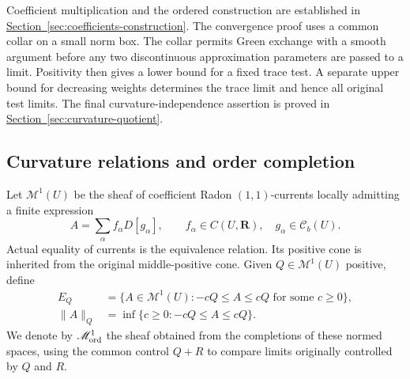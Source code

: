 \documentclass[11pt,reqno]{amsart}
\theoremstyle{definition}
\theoremstyle{remark}
\numberwithin{equation}{section}
\newcommand{\Cb}{\mathcal C_b}
\newcommand{\Mone}{\mathscr M^1}
\newcommand{\Real}{\mathbf R}
\newcommand{\MathSecref}[1]{\begingroup\hypersetup{linkcolor=SectionLink}\hyperref[#1]{Section~\ref*{#1}}\endgroup}
\begin{document}
Coefficient multiplication and the ordered construction are established
in \MathSecref{sec:coefficients-construction}. The convergence proof
uses a common collar on a small norm box. The collar permits Green
exchange with a smooth argument before any two discontinuous
approximation parameters are passed to a limit. Positivity then gives
a lower bound for a fixed trace test. A separate upper bound for
decreasing weights determines the trace limit and hence all original
test limits. The final curvature-independence assertion is proved in
\MathSecref{sec:curvature-quotient}.

\subsection{Curvature relations and order completion}

Let $\Mone(U)$ be the sheaf of coefficient Radon $(1,1)$-currents
locally admitting a finite expression
\begin{equation}\label{eq:main-module}
 A=\sum_\alpha f_\alpha D[g_\alpha],\qquad
 f_\alpha\in C(U,\Real),\quad g_\alpha\in\Cb(U).
\end{equation}
Actual equality of currents is the equivalence relation. Its positive
cone is inherited from the original middle-positive cone. Given
$Q\in\Mone(U)$ positive, define
\[
 \begin{aligned}
 E_Q&=\{A\in\Mone(U):-cQ\le A\le cQ\text{ for some }c\ge0\},\\
 \|A\|_Q&=\inf\{c\ge0:-cQ\le A\le cQ\}.
 \end{aligned}
\]
We denote by $\Mone_{\rm ord}$ the sheaf obtained from the completions
of these normed spaces, using the common control $Q+R$ to compare
limits originally controlled by $Q$ and $R$.
\end{document}
